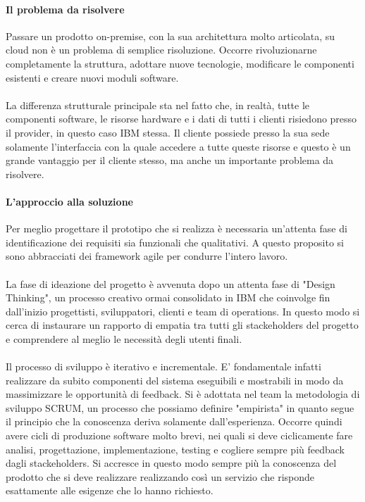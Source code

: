 \paragraph{Il problema da risolvere}
Passare un prodotto on-premise, con la sua architettura molto articolata, su cloud non è un problema di semplice risoluzione. Occorre rivoluzionarne completamente la struttura, adottare nuove tecnologie, modificare le componenti esistenti e creare nuovi moduli software. 

\paragraph{}
La differenza strutturale principale sta nel fatto che, in realtà, tutte le componenti software, le risorse hardware e i dati di tutti i clienti risiedono presso il provider, in questo caso IBM stessa. Il cliente possiede presso la sua sede solamente l'interfaccia con la quale accedere a tutte queste risorse e questo è un grande vantaggio per il cliente stesso, ma anche un importante problema da risolvere. 

\paragraph{L'approccio alla soluzione}
Per meglio progettare il prototipo che si realizza è necessaria un'attenta fase di identificazione dei requisiti sia funzionali che qualitativi. A questo proposito si sono abbracciati dei framework agile per condurre l'intero lavoro. 
\paragraph{}
La fase di ideazione del progetto è avvenuta dopo un attenta fase di "Design Thinking", un processo creativo ormai consolidato in IBM che coinvolge fin dall'inizio progettisti, sviluppatori, clienti e team di operations. In questo modo si cerca di instaurare un rapporto di empatia tra tutti gli stackeholders del progetto e comprendere al meglio le necessità degli utenti finali.
\paragraph{}
Il processo di sviluppo è iterativo e incrementale. E' fondamentale infatti realizzare da subito componenti del sistema eseguibili e mostrabili in modo da massimizzare le opportunità di feedback. Si è adottata nel team la metodologia di sviluppo SCRUM, un processo che possiamo definire "empirista" in quanto segue il principio che la conoscenza deriva solamente dall'esperienza. Occorre quindi avere cicli di produzione software molto brevi, nei quali si deve ciclicamente fare analisi, progettazione, implementazione, testing e cogliere sempre più feedback dagli stackeholders. Si accresce in questo modo sempre più la conoscenza del prodotto che si deve realizzare realizzando così un servizio che risponde esattamente alle esigenze che lo hanno richiesto.

